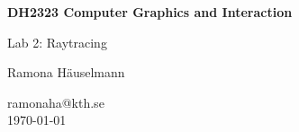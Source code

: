 \begin{titlepage}
\begin{center}
	\vspace{3em}	
    {\Huge\bfseries DH2323 Computer Graphics and Interaction\par}
    \vspace{2em}
    {\huge Lab 2: Raytracing \par}
    \vspace{3em}
    {\Large Ramona Häuselmann\par}
	\vspace{1em}
    ramonaha@kth.se\\
	\vspace{1em}
    \today
\end{center}
\end{titlepage}